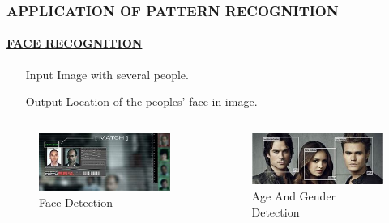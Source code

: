 \documentclass{beamer}
\begin{document}
\begin{frame}

\frametitle{APPLICATION OF PATTERN RECOGNITION}\pause
\framesubtitle{\underline{FACE RECOGNITION}}\pause
 \begin{itemize}
 \item[Input] Image with several people.\pause
 \item[Output] Location of the peoples' face in image.\pause

 \end{itemize}
 \begin{columns}
 \begin{column}{.6\textwidth}
\begin{figure}
\includegraphics[width=.6\textwidth]{fface.jpg}
\caption{Face Detection}\pause
\end{figure} 
 \end{column}
 \begin{column}{.6\textwidth}
\begin{figure}
\includegraphics[width=.6\textwidth]{facef.jpg}
\caption{Age And Gender Detection}\pause
\end{figure} 
 \end{column}
\end{columns}
\end{frame}
\end{document}
